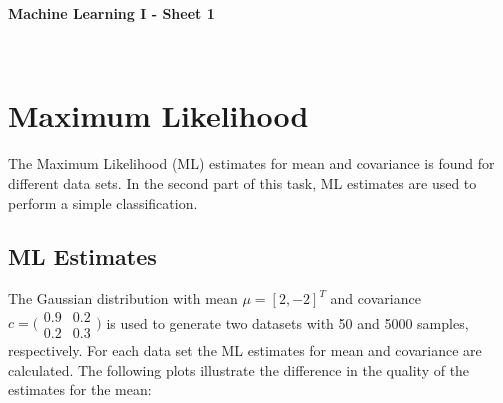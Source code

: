 \documentclass[DIV=12, ngerman, fontsize=12pt, parskip=half]{scrreprt}
\begin{document}
	
	\setcounter{chapter}{1-1}
	
	\begin{center}
		
		\huge
		\textbf{Machine Learning I - Sheet 1} 
	\end{center}


	\begin{center}
		\Large
	\end{center}
	
	
	\begin{center}
		\large
		\\
	
	\end{center}

	\thispagestyle{empty}
	\thispagestyle{empty}
	
	\vspace{0cm}
	
	{\let\clearpage\relax \chapter{Maximum Likelihood}}
	The Maximum Likelihood (ML) estimates for mean and covariance is found for different data sets. In the second part of this task, ML estimates are used to perform a simple classification.
	
	\section{ML Estimates}
	The Gaussian distribution with mean $\mu  = [2,-2]^T$ and covariance $c = \big(\begin{smallmatrix}
		0.9 & 0.2\\
		0.2 & 0.3
	\end{smallmatrix}\big)$
	is used to generate two datasets with 50 and 5000 samples, respectively. For each data set the ML estimates for mean and covariance are calculated. The following plots illustrate the difference in the quality of the estimates for the mean:
	
\end{document}
